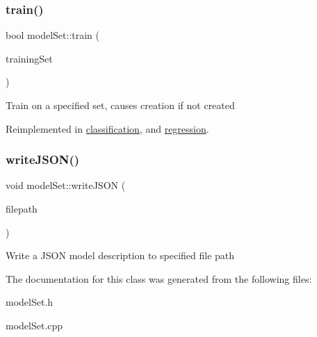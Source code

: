 \subsubsection{\texorpdfstring{train()}{train()}}
{\footnotesize\ttfamily bool model\+Set\+::train (\begin{DoxyParamCaption}\item[{std\+::vector$<$ \hyperlink{structtraining_example}{training\+Example} $>$}]{training\+Set }\end{DoxyParamCaption})\hspace{0.3cm}{\ttfamily [virtual]}}

Train on a specified set, causes creation if not created 

Reimplemented in \hyperlink{classclassification_a8e834c25309bc471c5bb8e8730874c82}{classification}, and \hyperlink{classregression_ae45d7dbf24cab75202d966d116829813}{regression}.

\mbox{\label{classmodel_set_a805879b6c8ec54d16c2ac511c72442b9}} 
\subsubsection{\texorpdfstring{write\+J\+S\+O\+N()}{writeJSON()}}
{\footnotesize\ttfamily void model\+Set\+::write\+J\+S\+ON (\begin{DoxyParamCaption}\item[{std\+::string}]{filepath }\end{DoxyParamCaption})}

Write a J\+S\+ON model description to specified file path 

The documentation for this class was generated from the following files\+:\begin{DoxyCompactItemize}
\item 
model\+Set.\+h\item 
model\+Set.\+cpp\end{DoxyCompactItemize}

